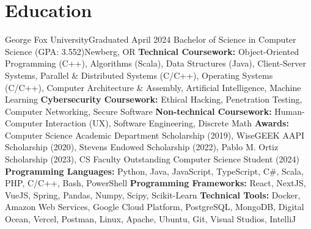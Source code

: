 
\section{Education}
\resumeSubHeadingListStart
    \resumeEducationSubheading
        {George Fox University}{Graduated April 2024}
        {Bachelor of Science in Computer Science (GPA: 3.552)}{Newberg, OR}
        {\textbf{Technical Coursework:} Object-Oriented Programming (C++), Algorithms (Scala), Data Structures (Java), Client-Server Systems, Parallel \& Distributed Systems (C/C++), Operating Systems (C/C++), Computer Architecture \& Assembly, Artificial Intelligence, Machine Learning}
        {\textbf{Cybersecurity Coursework:} Ethical Hacking, Penetration Testing, Computer Networking, Secure Software}
        {\textbf{Non-technical Coursework:} Human-Computer Interaction (UX), Software Engineering, Discrete Math}
        {\textbf{Awards:} Computer Science Academic Department Scholarship (2019), WiseGEEK AAPI Scholarship (2020), Stevens Endowed Scholarship (2022), Pablo M. Ortiz Scholarship (2023), CS Faculty Outstanding Computer Science Student (2024)}\\[10pt]

    \resumeSkillsSubheading
        {\textbf{Programming Languages:} Python, Java, JavaScript, TypeScript, C\#, Scala, PHP, C/C++, Bash, PowerShell}
        {\textbf{Programming Frameworks:} React, NextJS, VueJS, Spring, Pandas, Numpy, Scipy, Scikit-Learn}
        {\textbf{Technical Tools:} Docker, Amazon Web Services, Google Cloud Platform, PostgreSQL, MongoDB, Digital Ocean, Vercel, Postman, Linux, Apache, Ubuntu, Git, Visual Studios, IntelliJ}
\resumeSubHeadingListEnd

